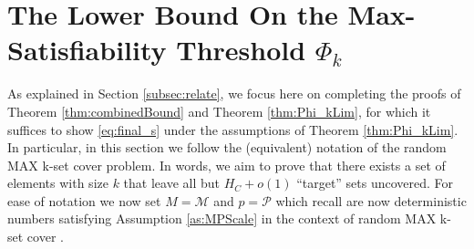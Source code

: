 \documentclass[12pt,reqno]{amsart}
\numberwithin{equation}{section}
\theoremstyle{definition}
\renewcommand{\epsilon}{\varepsilon}
\newcommand{\conv}[1]{\overset{#1}{\rightarrow}}
\renewcommand{\[}{\begin{equation}}
\renewcommand{\]}{\end{equation}}
\renewcommand{\|}{\bigg{|}}
\newcommand{\kset}{random MAX k-set cover }
\newcommand{\ngrow}{\ensuremath{n \conv{} +\infty} }
\newcommand{\mSet}{\mathcal{M}}
\newcommand{\pSet}{\mathcal{P}}
\begin{document}



\section{The Lower Bound On the Max-Satisfiability Threshold $\Phi_k$ }\label{subsec:Up}

As explained in Section \ref{subsec:relate}, we focus here on completing the proofs of Theorem \ref{thm:combinedBound} and Theorem \ref{thm:Phi_kLim}, for which it suffices to show \eqref{eq:final_s} under the assumptions of Theorem \ref{thm:Phi_kLim}. In particular, in this section we follow the (equivalent) notation of the \kset problem. In words, we aim to prove that there exists a set of elements with size $k$ that leave all but $H_C + o(1)$ ``target'' sets uncovered. For ease of notation we now set $M=\mSet$ and $p=\pSet$ which recall are now deterministic numbers satisfying Assumption \ref{as:MPScale} in the context of \kset.
\end{document}

